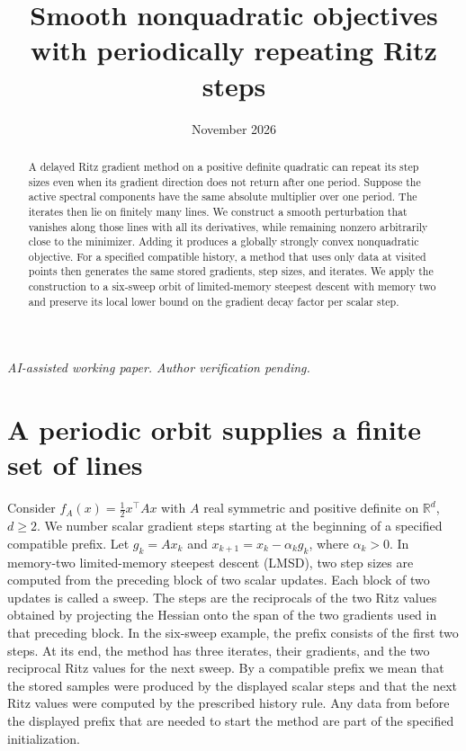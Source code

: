 \documentclass[11pt]{article}
\title{Smooth nonquadratic objectives with periodically repeating Ritz steps}
\author{}
\date{November 2026}
\newcommand{\R}{\mathbb R}
\begin{document}
\maketitle
\begin{center}\small\emph{AI-assisted working paper. Author verification pending.}\end{center}
\begin{abstract}
A delayed Ritz gradient method on a positive definite quadratic can
repeat its step sizes even when its gradient direction does not return
after one period. Suppose the active spectral components have the same absolute
multiplier over one period. The iterates then lie on finitely many
lines. We construct a smooth perturbation that vanishes along those
lines with all its derivatives, while remaining nonzero arbitrarily
close to the minimizer. Adding it produces a globally strongly convex
nonquadratic objective. For a specified compatible history, a method
that uses only data at visited points then generates the same stored
gradients, step sizes, and iterates. We apply the construction to a six-sweep orbit of
limited-memory steepest descent with memory two and preserve its local
lower bound on the gradient decay factor per scalar step.
\end{abstract}

\section{A periodic orbit supplies a finite set of lines}

Consider \(f_A(x)=\tfrac12 x^\top A x\) with \(A\) real symmetric and
positive definite on \(\R^d\), \(d\ge 2\). We number scalar gradient steps
starting at the beginning of a specified compatible prefix. Let
\(g_k=Ax_k\) and \(x_{k+1}=x_k-\alpha_k g_k\), where \(\alpha_k>0\).
In memory-two limited-memory steepest descent (LMSD), two step sizes
are computed from the preceding block of two scalar updates. Each
block of two updates is called a sweep. The steps are the reciprocals
of the two Ritz values obtained by projecting the Hessian onto the
span of the two gradients used in that preceding block. In the six-sweep example, the prefix consists of the first two
steps. At its end, the method has three iterates, their gradients,
and the two reciprocal Ritz values for the next sweep. By a compatible prefix
we mean that the stored samples were produced by the displayed scalar
steps and that the next Ritz values were computed by the prescribed
history rule. Any data from before the displayed prefix that are needed to
start the method are part of the specified initialization.
\end{document}
